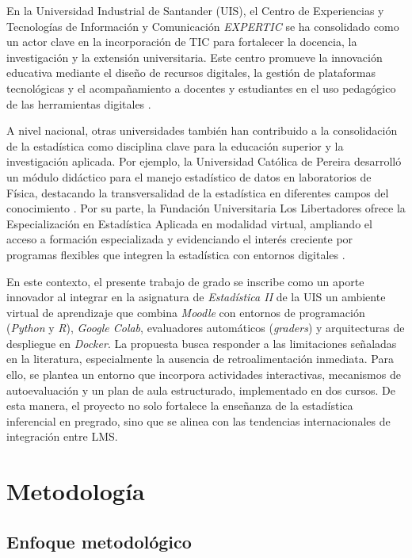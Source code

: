 \documentclass[letter,oneside,12pt,spanish]{report}
\begin{document}
En la Universidad Industrial de Santander (UIS), el Centro de Experiencias y 
Tecnologías de Información y Comunicación \textit{EXPERTIC} se ha consolidado como un actor clave 
en la incorporación de TIC para fortalecer la docencia, la investigación y la extensión universitaria. 
Este centro promueve la innovación educativa mediante el diseño de recursos digitales, la gestión de 
plataformas tecnológicas y el acompañamiento a docentes y estudiantes en el uso pedagógico de las 
herramientas digitales \parencite{UIS2025a}. 

A nivel nacional, otras universidades también han contribuido a la consolidación de la estadística
 como disciplina clave para la educación superior y la investigación aplicada. Por ejemplo, la 
 Universidad Católica de Pereira desarrolló un módulo didáctico para el manejo estadístico de 
 datos en laboratorios de Física, destacando la transversalidad de la estadística en diferentes 
 campos del conocimiento \parencite{ucp2018}. Por su parte, la Fundación Universitaria Los 
 Libertadores ofrece la Especialización en Estadística Aplicada en modalidad virtual, ampliando 
 el acceso a formación especializada y evidenciando el interés creciente por programas flexibles 
 que integren la estadística con entornos digitales \parencite{libertadoressf}.

En este contexto, el presente trabajo de grado se inscribe como un aporte innovador al 
integrar en la asignatura de \textit{Estadística II} de la UIS un ambiente virtual de aprendizaje 
que combina \textit{Moodle} con entornos de programación (\textit{Python} y \textit{R}), 
\textit{Google Colab}, evaluadores automáticos (\textit{graders}) y arquitecturas de despliegue en 
\textit{Docker}. La propuesta busca responder a las limitaciones señaladas en la literatura, 
especialmente la ausencia de retroalimentación inmediata. Para ello, se plantea un entorno que 
incorpora actividades interactivas, mecanismos de autoevaluación y un plan de aula estructurado, 
implementado en dos cursos. De esta manera, el proyecto no solo fortalece la enseñanza de la 
estadística inferencial en pregrado, sino que se alinea con las tendencias internacionales de 
integración entre LMS.

\newpage

\chapter{Metodología}

\section{Enfoque metodológico}
\end{document}
